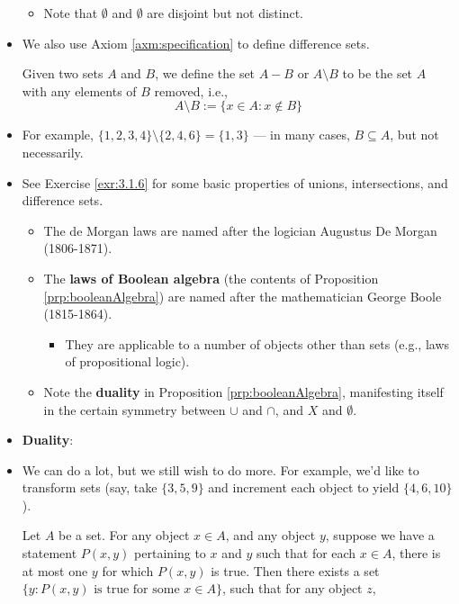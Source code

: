 \documentclass[../main.tex]{subfiles}
\begin{document}
\begin{itemize}
    \begin{itemize}
        \item Note that $\emptyset$ and $\emptyset$ are disjoint but not distinct.
    \end{itemize}
    \item We also use Axiom \ref{axm:specification} to define difference sets.
    \begin{dfn}\label{dfn:differenceSets}
        Given two sets $A$ and $B$, we define the set $A-B$ or $A\setminus B$ to be the set $A$ with any elements of $B$ removed, i.e.,
        \begin{equation*}
            A\setminus B := \{x\in A:x\notin B\}
        \end{equation*}
    \end{dfn}
    \item For example, $\{1,2,3,4\}\setminus\{2,4,6\}=\{1,3\}$ --- in many cases, $B\subseteq A$, but not necessarily.
    \item {}See Exercise \ref{exr:3.1.6} for some basic properties of unions, intersections, and difference sets.
    \begin{itemize}
        \item The de Morgan laws are named after the logician Augustus De Morgan (1806-1871).
        \item The \textbf{laws of Boolean algebra} (the contents of Proposition \ref{prp:booleanAlgebra}) are named after the mathematician George Boole (1815-1864).
        \begin{itemize}
            \item They are applicable to a number of objects other than sets (e.g., laws of propositional logic).
        \end{itemize}
        \item Note the \textbf{duality} in Proposition \ref{prp:booleanAlgebra}, manifesting itself in the certain symmetry between $\cup$ and $\cap$, and $X$ and $\emptyset$.
    \end{itemize}
    \item \textbf{Duality}: 
    \item We can do a lot, but we still wish to do more. For example, we'd like to transform sets (say, take $\{3,5,9\}$ and increment each object to yield $\{4,6,10\}$).
    \begin{axm}[Replacement]\label{axm:replacement}
        Let $A$ be a set. For any object $x\in A$, and any object $y$, suppose we have a statement $P(x,y)$ pertaining to $x$ and $y$ such that for each $x\in A$, there is at most one $y$ for which $P(x,y)$ is true. Then there exists a set $\{y:P(x,y)\text{ is true for some }x\in A\}$, such that for any object $z$,

\end{axm}
\end{itemize}
\end{document}
